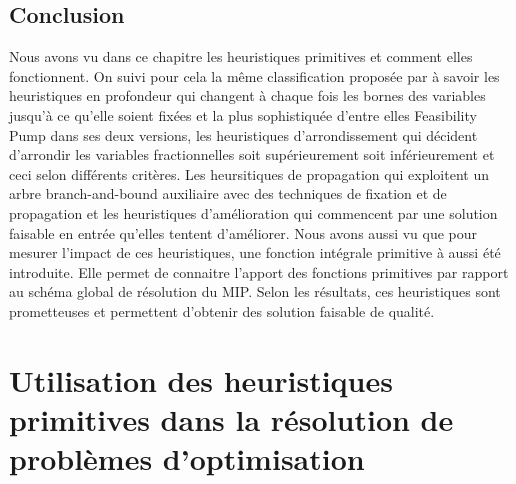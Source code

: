 \documentclass[12pt,a4paper,oneside]{book}
\theoremstyle{definition}
\begin{document}
	
	
	
	\section{Conclusion}
	Nous avons vu dans ce chapitre les heuristiques primitives et comment elles fonctionnent. On suivi pour cela la même classification proposée par \cite{berthold2006} à savoir les heuristiques en profondeur qui changent à chaque fois les bornes des variables jusqu'à ce qu'elle soient fixées et la plus sophistiquée d'entre elles Feasibility Pump dans ses deux versions, les heuristiques d'arrondissement qui décident d'arrondir les variables fractionnelles soit supérieurement soit inférieurement et ceci selon différents critères. Les heursitiques de propagation qui exploitent un arbre branch-and-bound auxiliaire avec des techniques de fixation et de propagation et les heuristiques d'amélioration qui commencent par une solution faisable en entrée qu'elles tentent d'améliorer. Nous avons aussi vu que pour mesurer l'impact de ces heuristiques, une fonction intégrale primitive à aussi été introduite. Elle permet de connaitre l'apport des fonctions primitives par rapport au schéma global de résolution du MIP. Selon les résultats, ces heuristiques sont prometteuses et permettent d'obtenir des solution faisable de qualité. 
	
	\chapter{Utilisation des heuristiques primitives dans la résolution de problèmes d'optimisation}
	
\end{document}
